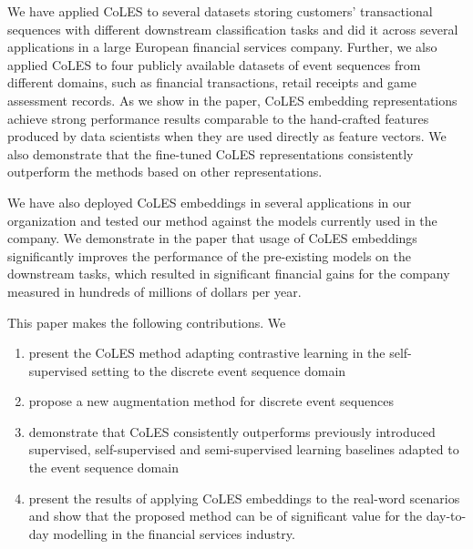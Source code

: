 \documentclass[sigconf]{acmart}
\begin{document}
We have applied CoLES to several datasets storing customers' transactional sequences with different downstream classification tasks and did it across several applications in a large European financial services company. Further, we also applied CoLES to four publicly available datasets of event sequences from different domains, such as financial transactions, retail receipts and game assessment records. As we show in the paper, CoLES embedding representations achieve strong performance results comparable to the hand-crafted features produced by data scientists when they are used directly as feature vectors.
We also demonstrate that the fine-tuned CoLES representations consistently outperform the methods based on other representations. %

We have also deployed CoLES embeddings 
in several applications in our organization 
and tested our method against the models currently used in the company. 
We demonstrate in the paper that usage of CoLES embeddings significantly improves the performance of the pre-existing models on the downstream tasks, which resulted in significant financial gains for the company measured in hundreds of millions of dollars per year.


This paper makes the following contributions. We
\begin{enumerate}
\item present the CoLES method adapting contrastive learning in the self-supervised setting to the discrete event sequence domain
\item propose a new
augmentation method for discrete event sequences
\item demonstrate that CoLES consistently outperforms previously introduced supervised, self-supervised and semi-supervised learning baselines adapted to the event sequence domain
\item present the results of applying CoLES embeddings to the real-word scenarios and show that the proposed method can be of significant value for the day-to-day modelling in the financial services industry.
\end{enumerate}
\end{document}
